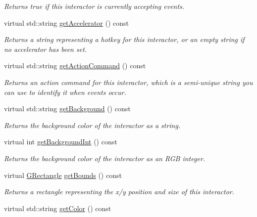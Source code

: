 \begin{DoxyCompactItemize}
\begin{DoxyCompactList}\small\item\em Returns true if this interactor is currently accepting events. \end{DoxyCompactList}\item 
virtual std\+::string \mbox{\hyperlink{classsgl_1_1GInteractor_a69f8d23ed8f207fbecad99960776e942}{get\+Accelerator}} () const
\begin{DoxyCompactList}\small\item\em Returns a string representing a hotkey for this interactor, or an empty string if no accelerator has been set. \end{DoxyCompactList}\item 
virtual std\+::string \mbox{\hyperlink{classsgl_1_1GInteractor_a94eb4276000c4fdfb508ce9e6317a82a}{get\+Action\+Command}} () const
\begin{DoxyCompactList}\small\item\em Returns an action command for this interactor, which is a semi-\/unique string you can use to identify it when events occur. \end{DoxyCompactList}\item 
virtual std\+::string \mbox{\hyperlink{classsgl_1_1GInteractor_a808e22cc1fdfbecf71ed8c64ef4600e0}{get\+Background}} () const
\begin{DoxyCompactList}\small\item\em Returns the background color of the interactor as a string. \end{DoxyCompactList}\item 
virtual int \mbox{\hyperlink{classsgl_1_1GInteractor_a9e827257a55cb8cf4d9de2ec6bcfd7a0}{get\+Background\+Int}} () const
\begin{DoxyCompactList}\small\item\em Returns the background color of the interactor as an R\+GB integer. \end{DoxyCompactList}\item 
virtual \mbox{\hyperlink{structsgl_1_1GRectangle}{G\+Rectangle}} \mbox{\hyperlink{classsgl_1_1GInteractor_a29e6ac35a0b48f491a4c88194cc5da3b}{get\+Bounds}} () const
\begin{DoxyCompactList}\small\item\em Returns a rectangle representing the x/y position and size of this interactor. \end{DoxyCompactList}\item 
virtual std\+::string \mbox{\hyperlink{classsgl_1_1GInteractor_aa061dfa488c31e18549d64363c1d0e34}{get\+Color}} () const

\end{DoxyCompactItemize}
